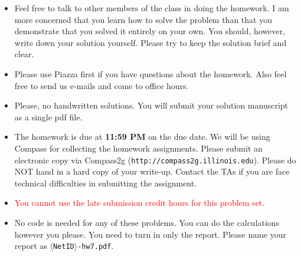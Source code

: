 
\usepackage{amsmath,url,graphicx,amssymb}
\usepackage{xcolor}
\sloppy

\oddsidemargin 0in
\evensidemargin 0in
\textwidth 6.5in
\topmargin -0.5in
\textheight 9.0in

\newcommand{\bb}[1]{{\bf #1}}
\newcommand{\tight}[1]{\!#1\!}
\newcommand{\loose}[1]{\;#1\;}




\begin{footnotesize}
  \begin{itemize}
    \item Feel free to talk to other members of the class in doing the homework.
      I am more concerned that you learn how to solve the problem than that you
      demonstrate that you solved it entirely on your own.  You should, however,
      write down your solution yourself.  Please try to keep the solution brief
      and clear.

    \item Please use Piazza first if you have questions about the homework.
      Also feel free to send us e-mails and come to office hours.

    \item Please, no handwritten solutions.  You will submit your solution
      manuscript as a single pdf file.

    \item The homework is due at \textbf{11:59 PM} on the due date. We will be
      using Compass for collecting the homework assignments. Please submit an
      electronic copy via Compass2g (\texttt{http://compass2g.illinois.edu}).
      Please do NOT hand in a hard copy of your write-up.  Contact the TAs if you
      are face technical difficulties in submitting the assignment.

    \item \textcolor{red}{You cannot use the late submission credit hours for this problem set.}

    \item No code is needed for any of these problems. You can do the
      calculations however you please. You need to turn in only the report. Please
      name your report as \texttt{$\langle$NetID$\rangle$-hw7.pdf}.
  \end{itemize}
\end{footnotesize}


